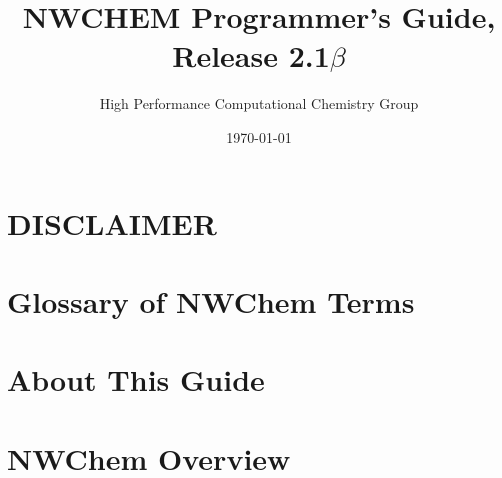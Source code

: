 \setlength{\parskip}{6pt}

\newcommand{\TRUE}{\verb+.true.+}
\newcommand{\FALSE}{\verb+.false.+}
\newcommand{\nwchemversion}{2.1$\beta$}
\newcommand{\nwchemyear}{1997}



\title{\bf\Large NWCHEM Programmer's Guide, Release \nwchemversion}
\author{High Performance Computational Chemistry Group}
\date{\today}
\maketitle

\chapter*{\center DISCLAIMER}


\chapter*{Glossary of NWChem Terms}


\chapter*{About This Guide}


\clearpage

\tableofcontents

\clearpage

\chapter{NWChem Overview}



